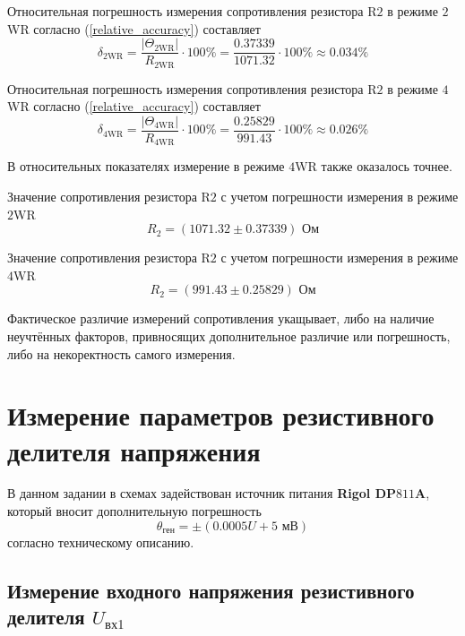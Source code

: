 \documentclass[12pt,a4paper]{article}
\begin{document}
Относительная погрешность измерения сопротивления резистора R$2$ в режиме $2$WR согласно (\ref{relative_accuracy}) составляет
\begin{equation*}
\delta_{2\text{WR}} = \frac{\left|\Theta_{2\text{WR}}\right|}{R_{2\text{WR}}} \cdot 100\% = \frac{0.37339}{1071.32} \cdot 100\% \approx 0.034\%
\end{equation*}

Относительная погрешность измерения сопротивления резистора R$2$ в режиме $4$WR согласно (\ref{relative_accuracy}) составляет
\begin{equation*}
\delta_{4\text{WR}} = \frac{\left|\Theta_{4\text{WR}}\right|}{R_{4\text{WR}}} \cdot 100\% = \frac{0.25829}{991.43} \cdot 100\% \approx 0.026\%
\end{equation*}

В относительных показателях измерение в режиме $4$WR также оказалось точнее.

Значение сопротивления резистора R$2$ с учетом погрешности измерения в режиме $2$WR
\begin{equation*}
R_2 = (1071.32 \pm 0.37339) \text{ Ом}
\end{equation*}

Значение сопротивления резистора R$2$ с учетом погрешности измерения в режиме $4$WR
\begin{equation*}
R_2 = (991.43 \pm 0.25829) \text{ Ом}
\end{equation*}

Фактическое различие измерений сопротивления укащывает, либо на наличие неучтённых 
факторов, привносящих дополнительное различие или погрешность, либо на некоректность 
самого измерения.


\section{Измерение параметров резистивного делителя напряжения}

В данном задании в схемах задействован источник питания \textbf{Rigol DP$811$A}, 
который вносит дополнительную погрешность 
\begin{equation}
	\theta_{\text{ген}} = \pm(0.0005 U + 5 \text{ мВ}) 
	\label{accuracy_generator}
\end{equation}
согласно техническому описанию.

\subsection{Измерение входного напряжения резистивного делителя $U_{\text{вх1}}$}
\end{document}
